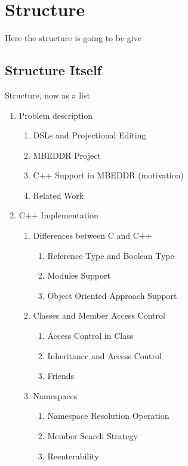 \chapter{Structure}
\label{chapter:Structure}

Here the structure is going to be give

\section{Structure Itself}

Structure, now as a list

\begin{enumerate}
  
  \item Problem description
  
  \begin{enumerate}
    \item DSLs and Projectional Editing
    \item MBEDDR Project
    \item C++ Support in MBEDDR (motivation)
    \item Related Work
  \end{enumerate}
  
  \item C++ Implementation
    \begin{enumerate}
      \item Differences between C and C++
	\begin{enumerate}
	 \item Reference Type and Boolean Type
	 \item Modules Support
	 \item Object Oriented Approach Support
	\end{enumerate}
      
      \item Classes and Member Access Control
	\begin{enumerate}
	 \item Access Control in Class
	 \item Inheritance and Access Control
	 \item Friends	 
	\end{enumerate}

      
      \item Namespaces
	\begin{enumerate}
	 \item Namespace Resolution Operation
	 \item Member Search Strategy
	 \item Reenterability
	\end{enumerate}


\end{enumerate}
\end{enumerate}
